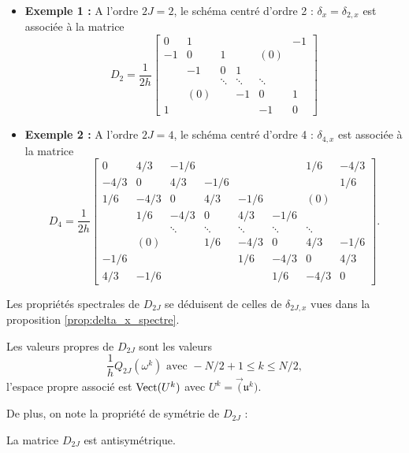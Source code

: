 \begin{itemize}
\item \textbf{Exemple 1 :} A l'ordre $2J=2$,  le schéma centré d'ordre 2 : $\delta_x = \delta_{2,x}$ est associée à la matrice
\begin{equation}
D_2 = \dfrac{1}{2h}
\begin{bmatrix}
0 & 1 &   &   &   & -1 \\ 
-1 & 0 & 1 &   & (0) &   \\ 
  & -1 & 0 & 1 &   &   \\ 
  &   & \ddots & \ddots & \ddots &   \\ 
  & (0) &   & -1 & 0 & 1 \\ 
1 &   &   &   & -1 & 0
\end{bmatrix} 
\label{eq:matrice_D2}
\end{equation}

\item \textbf{Exemple 2 :} A l'ordre $2J=4$,  le schéma centré d'ordre 4 : $\delta_{4,x}$ est associée à la matrice
\begin{equation}
D_4 = \dfrac{1}{2h}
\begin{bmatrix}
0 & 4/3 & -1/6 &   &   &   & 1/6 & -4/3 \\ 
-4/3 & 0 & 4/3 & -1/6 &   &   &   & 1/6 \\ 
1/6 & -4/3 & 0 & 4/3 & -1/6 &  & (0) &   \\ 
  & 1/6 & -4/3 & 0 & 4/3 & -1/6 &   &   \\ 
  &   & \ddots & \ddots & \ddots & \ddots & \ddots &   \\ 
  &  (0)& & 1/6 & -4/3 & 0 & 4/3 & -1/6 \\ 
-1/6 &   &   &   & 1/6 & -4/3 & 0 & 4/3 \\ 
4/3 & -1/6 &   &   &   & 1/6 & -4/3 & 0
\end{bmatrix}.
\end{equation}
\end{itemize}

Les propriétés spectrales de $D_{2J}$ se déduisent de celles de $\delta_{2J,x}$ vues dans la proposition \ref{prop:delta_x_spectre}.
\begin{proposition}
Les valeurs propres de $D_{2J}$ sont les valeurs 
\begin{equation}
\dfrac{1}{h}Q_{2J}(\omega^k) \text{ avec }-N/2 +1 \leq k \leq N/2,
\end{equation}
l'espace propre associé est $\text{Vect} (U^k)$ avec $U^k = \vec (\mathfrak{u}^k)$.
\end{proposition}
De plus, on note la propriété de symétrie de $D_{2J}$ :
\begin{proposition}
La matrice $D_{2J}$ est antisymétrique.
\end{proposition}

